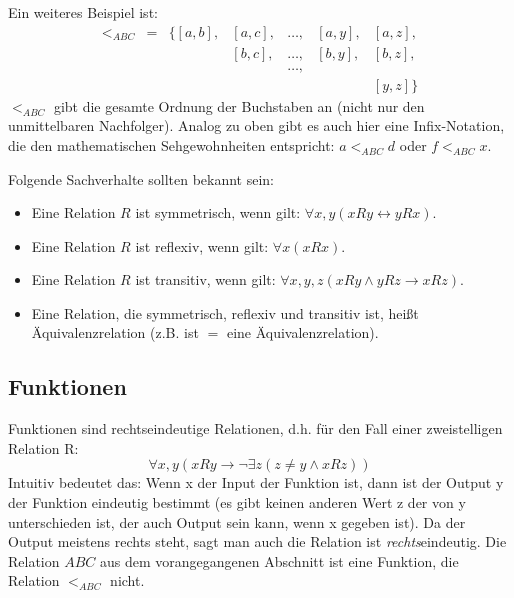 Ein weiteres Beispiel ist:
\[
    \begin{array}{lllllll}
        <_{ABC} &
        = &
            \{[a,b], &
            [a,c], &
            \ldots, &
            [a,y], &
            [a,z],\\ 
        &
        & 
        &
            [b,c], &
            \ldots, &
            [b,y], &
            [b,z], \\
        &
        &
        &
        &
            \ldots,\\
        &
        &
        &
        &
        &     
        &
            [y,z] \}
\end{array}
\]
$<_{ABC}$ gibt die gesamte Ordnung der Buchstaben an (nicht nur den unmittelbaren Nachfolger).
Analog zu oben gibt es auch hier eine Infix-Notation,
die den mathematischen Sehgewohnheiten entspricht: $a <_{ABC} d$ oder $f <_{ABC} x$.

\noindent
Folgende Sachverhalte sollten bekannt sein:
\begin{itemize}
    \item Eine Relation $R$ ist symmetrisch, wenn gilt: $\forall x,y(xRy \leftrightarrow yRx)$.
    \item Eine Relation $R$ ist reflexiv, wenn gilt: $\forall x(xRx)$.
    \item Eine Relation $R$ ist transitiv,
        wenn gilt: $\forall x,y,z(xRy \wedge yRz \rightarrow xRz)$.
    \item Eine Relation, die symmetrisch, reflexiv und transitiv ist,
          heißt Äquivalenzrelation (z.B. ist $=$ eine Äquivalenzrelation).
\end{itemize}

\subsection{Funktionen}
Funktionen sind rechtseindeutige Relationen,
d.h. für den Fall einer zweistelligen Relation R:
\[
    \forall x,y (xRy \rightarrow \neg \exists z (z \neq y \wedge xRz))
\]
Intuitiv bedeutet das: Wenn x der Input der Funktion ist,
dann ist der Output y der Funktion eindeutig bestimmt
(es gibt keinen anderen Wert z der von y unterschieden ist,
der auch Output sein kann, wenn x gegeben ist). 
Da der Output meistens rechts steht, sagt man auch die Relation ist \emph{rechts}eindeutig. 
Die Relation $ABC$ aus dem vorangegangenen Abschnitt ist eine Funktion,
die Relation $<_{ABC}$ nicht.


